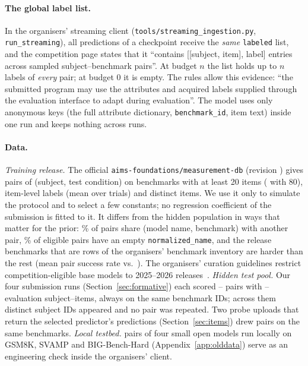\documentclass{article}
\begin{document}
\paragraph{The global label list.} In the organisers' streaming client (\texttt{tools/streaming\_ingestion.py}, \texttt{run\_streaming}), all predictions of a checkpoint receive the \emph{same} \texttt{labeled} list, and the competition page states that it ``contains [[subject, item], label] entries across sampled subject--benchmark pairs''. At budget $n$ the list holds up to $n$ labels of \emph{every} pair; at budget 0 it is empty. The rules allow this evidence: ``the submitted program may use the attributes and acquired labels supplied through the evaluation interface to adapt during evaluation''. The model uses only anonymous keys (the full attribute dictionary, \texttt{benchmark\_id}, item text) inside one run and keeps nothing across runs.

\paragraph{Data.} \emph{Training release.} The official \texttt{aims-foundations/measurement-db} (revision \texttt{\FitRevisionShort}) gives \XpFrNPairs{} pairs of (subject, test condition) on \XpFrNBench{} benchmarks with at least 20 items (\XpFrNPairsEighty{} with 80), \XpFrNRows{} item-level labels (mean over trials) and \XpFrNItems{} distinct items. We use it only to simulate the protocol and to select a few constants; no regression coefficient of the submission is fitted to it. It differs from the hidden population in ways that matter for the prior: \XpFrShareNameBench\% of pairs share (model name, benchmark) with another pair, \DdPopEmptyName\% of eligible pairs have an empty \texttt{normalized\_name}, and the \DdPopNInvBench{} release benchmarks that are rows of the organisers' benchmark inventory are harder than the rest (mean pair success rate \DdPopInvRate{} vs.\ \DdPopNonInvRate). The organisers' curation guidelines restrict competition-eligible base models to 2025--2026 releases~\citep{paiec2026}. \emph{Hidden test pool.} Our four submission runs (Section~\ref{sec:formative}) each scored \FmNPairsMin--\FmNPairsMax{} pairs with \FmNItemsMin--\FmNItemsMax{} evaluation subject--items, always on the same \FmNBenchAll{} benchmark IDs; across them \FmNSubjAll{} distinct subject IDs appeared and no pair was repeated. Two probe uploads that return the selected predictor's predictions (Section~\ref{sec:items}) drew pairs on the same \SdSharedBenchMin{} benchmarks. \emph{Local testbed.} \XpRealNPairs{} pairs of four small open models run locally on GSM8K, SVAMP and BIG-Bench-Hard (Appendix~\ref{app:olddata}) serve as an engineering check inside the organisers' client.
\end{document}
